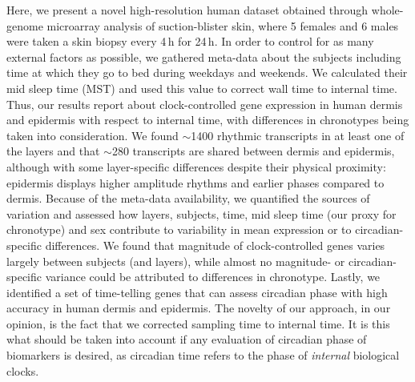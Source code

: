 Here, we present a novel high-resolution human dataset obtained through whole-genome microarray analysis of suction-blister skin, where 5 females and 6 males were taken a skin biopsy every 4\,h for 24\,h. In order to control for as many external factors as possible, we gathered meta-data about the subjects including time at which they go to bed during weekdays and weekends. We calculated their mid sleep time (MST) and used this value to correct wall time to internal time. Thus, our results report about clock-controlled gene expression in human dermis and epidermis with respect to internal time, with differences in chronotypes being taken into consideration. We found $\sim$1400 rhythmic transcripts in at least one of the layers and that $\sim$280 transcripts are shared between dermis and epidermis, although with some layer-specific differences despite their physical proximity: epidermis displays higher amplitude rhythms and earlier phases compared to dermis. Because of the meta-data availability, we quantified the sources of variation and assessed how layers, subjects, time, mid sleep time (our proxy for chronotype) and sex contribute to variability in mean expression or to circadian-specific differences. We found that magnitude of clock-controlled genes varies largely between subjects (and layers), while almost no magnitude- or circadian-specific variance could be attributed to differences in chronotype. Lastly, we identified a set of time-telling genes that can assess circadian phase with high accuracy in human dermis and epidermis. The novelty of our approach, in our opinion, is the fact that we corrected sampling time to internal time. It is this what should be taken into account if any evaluation of circadian phase of biomarkers is desired, as circadian time refers to the phase of \textit{internal} biological clocks.


